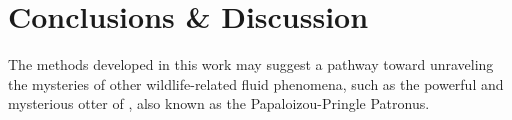 \section{Conclusions \& Discussion}
\label{sec:conclusions}

The methods developed in this work may suggest a pathway toward
unraveling the mysteries of other wildlife-related fluid phenomena,
such as the powerful and mysterious otter of \cite{Schwab2021}, also
known as the Papaloizou-Pringle Patronus.

